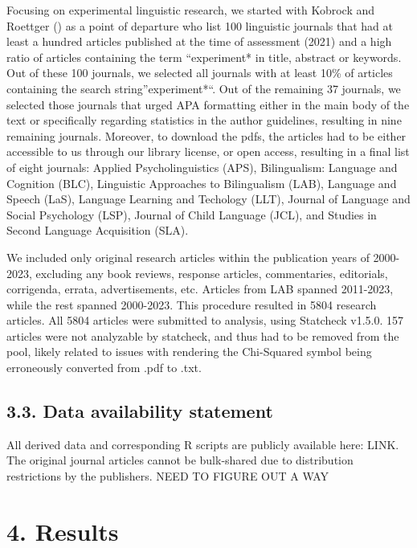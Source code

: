 \documentclass[
  doc,
  longtable,
  nolmodern,
  notxfonts,
  notimes,
  colorlinks=true,linkcolor=blue,citecolor=blue,urlcolor=blue]{apa7}
\begin{document}
Focusing on experimental linguistic research, we started with Kobrock
and Roettger () as a point of
departure who list 100 linguistic journals that had at least a hundred
articles published at the time of assessment (2021) and a high ratio of
articles containing the term ``experiment* in title, abstract or
keywords. Out of these 100 journals, we selected all journals with at
least 10\% of articles containing the search string''experiment*``. Out
of the remaining 37 journals, we selected those journals that urged APA
formatting either in the main body of the text or specifically regarding
statistics in the author guidelines, resulting in nine remaining
journals. Moreover, to download the pdfs, the articles had to be either
accessible to us through our library license, or open access, resulting
in a final list of eight journals: Applied Psycholinguistics (APS),
Bilingualism: Language and Cognition (BLC), Linguistic Approaches to
Bilingualism (LAB), Language and Speech (LaS), Language Learning and
Techology (LLT), Journal of Language and Social Psychology (LSP),
Journal of Child Language (JCL), and Studies in Second Language
Acquisition (SLA).

We included only original research articles within the publication years
of 2000-2023, excluding any book reviews, response articles,
commentaries, editorials, corrigenda, errata, advertisements, etc.
Articles from LAB spanned 2011-2023, while the rest spanned 2000-2023.
This procedure resulted in 5804 research articles. All 5804 articles
were submitted to analysis, using Statcheck v1.5.0. 157 articles were
not analyzable by statcheck, and thus had to be removed from the pool,
likely related to issues with rendering the Chi-Squared symbol being
erroneously converted from .pdf to .txt.

\subsection{3.3. Data availability
statement}\label{data-availability-statement}

All derived data and corresponding R scripts are publicly available
here: LINK. The original journal articles cannot be bulk-shared due to
distribution restrictions by the publishers. NEED TO FIGURE OUT A WAY

\section{4. Results}\label{results}
\end{document}

